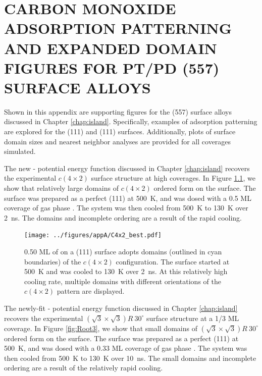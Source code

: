 
\chapter{CARBON MONOXIDE ADSORPTION PATTERNING AND EXPANDED DOMAIN FIGURES FOR PT/PD (557) SURFACE ALLOYS}
\label{app:SI}

Shown in this appendix are supporting figures for the  (557) surface
alloys discussed in Chapter \ref{chap:island}. Specifically, examples of
 adsorption patterning are explored for the  (111) and 
(111) surfaces. Additionally, plots of surface domain sizes and nearest
neighbor analyses are provided for all  coverages simulated.
\newpage



The new - potential energy function discussed in Chapter \ref{chap:island} 
recovers the experimental $c(4 \times 2)$ surface structure
at high coverages.  In Figure \ref{fig:C4x2}, we show that relatively
large domains of $c(4 \times 2)$ ordered  form on the surface.
The surface was prepared as a perfect (111) at 500~K, and was
dosed with a 0.5 ML coverage of gas phase .  The system was
then cooled from 500~K to 130~K over 2~ns.  The domains and incomplete
ordering are a result of the rapid cooling.

\begin{figure}
  \centering
  \texttt{[image: ../figures/appA/C4x2\_best.pdf]}
  \caption{0.50 ML of  on a (111) surface adopts domains
    (outlined in cyan boundaries) of the $c(4 \times 2)$
    configuration. The surface started at 500~K and was cooled to
    130~K over 2~ns.  At this relatively high cooling rate, multiple
    domains with different orientations of the $c(4 \times 2)$ pattern
    are displayed.}
\label{fig:C4x2}
\end{figure}
\newpage



The newly-fit - potential energy function discussed in Chapter \ref{chap:island}
recovers the experimental
$(\sqrt{3} \times \sqrt{3}) R~30^{\circ}$ surface structure at a 1/3
ML coverage.  In Figure \ref{fig:Root3}, we show that small domains of
$(\sqrt{3} \times \sqrt{3}) R~30^{\circ}$ ordered  form on the
surface.  The surface was prepared as a perfect (111) at 500~K,
and was dosed with a 0.33 ML coverage of gas phase .  The
system was then cooled from 500~K to 130~K over 10~ns.  The small
domains and incomplete ordering are a result of the relatively rapid
cooling.

